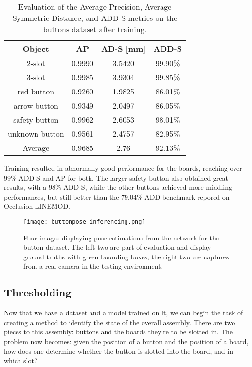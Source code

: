 \begin{table}[ht]
    \begin{center}
        \begin{tabular}{|c||c|c|c|}
            \hline
            Object & AP & AD-S [mm] & ADD-S \\
            \hline \hline
            2-slot & 0.9990 & 3.5420 & 99.90\% \\
            3-slot & 0.9985 & 3.9304 & 99.85\% \\
            red button & 0.9260 & 1.9825 & 86.01\% \\
            arrow button & 0.9349 & 2.0497 & 86.05\% \\
            safety button & 0.9962 & 2.6053 & 98.01\% \\
            unknown button & 0.9561 & 2.4757 & 82.95\% \\
            \hline \hline
            Average & 0.9685 & 2.76 & 92.13\% \\
            \hline    
        \end{tabular}
        \caption{Evaluation of the Average Precision, Average Symmetric Distance, and ADD-S metrics on the buttons dataset after training.}
        \label{tab:buttonpose}
    \end{center}
\end{table}

Training resulted in abnormally good performance for the boards, reaching over 99\% ADD-S and AP for both. The larger safety button also obtained great results, with a 98\% ADD-S, while the other buttons achieved more middling performances, but still better than the 79.04\% ADD benchmark repored on Occlusion-LINEMOD.

\begin{figure}[ht]
    \texttt{[image: buttonpose\_inferencing.png]}
    \caption{Four images displaying pose estimations from the network for the button dataset. The left two are part of evaluation and display ground truths with green bounding boxes, the right two are captures from a real camera in the testing environment.}
    \label{fig:buttonpose_inferencing}
\end{figure}

\subsection{Thresholding}

Now that we have a dataset and a model trained on it, we can begin the task of creating a method to identify the state of the overall assembly. There are two pieces to this assembly: buttons and the boards they're to be slotted in. The problem now becomes: given the position of a button and the position of a board, how does one determine whether the button is slotted into the board, and in which slot?

